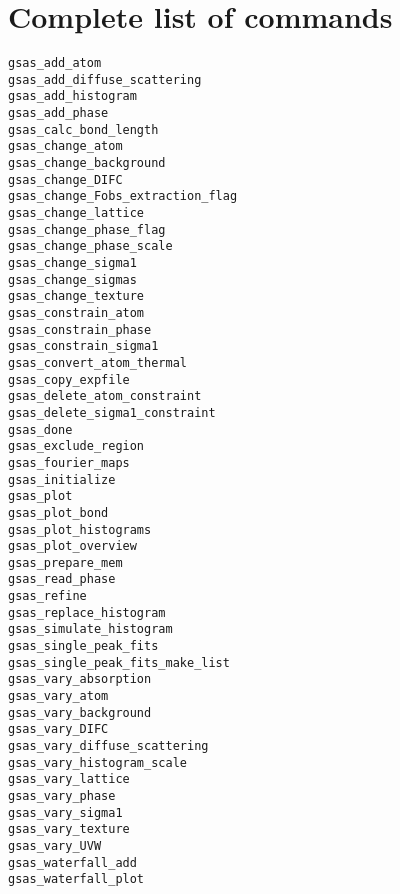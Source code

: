 \section{Complete list of commands}

\begin{verbatim}
gsas_add_atom
gsas_add_diffuse_scattering
gsas_add_histogram
gsas_add_phase
gsas_calc_bond_length
gsas_change_atom
gsas_change_background
gsas_change_DIFC
gsas_change_Fobs_extraction_flag
gsas_change_lattice
gsas_change_phase_flag
gsas_change_phase_scale
gsas_change_sigma1
gsas_change_sigmas
gsas_change_texture
gsas_constrain_atom
gsas_constrain_phase
gsas_constrain_sigma1
gsas_convert_atom_thermal
gsas_copy_expfile
gsas_delete_atom_constraint
gsas_delete_sigma1_constraint
gsas_done
gsas_exclude_region
gsas_fourier_maps
gsas_initialize
gsas_plot
gsas_plot_bond
gsas_plot_histograms
gsas_plot_overview
gsas_prepare_mem
gsas_read_phase
gsas_refine
gsas_replace_histogram
gsas_simulate_histogram
gsas_single_peak_fits
gsas_single_peak_fits_make_list
gsas_vary_absorption
gsas_vary_atom
gsas_vary_background
gsas_vary_DIFC
gsas_vary_diffuse_scattering
gsas_vary_histogram_scale
gsas_vary_lattice
gsas_vary_phase
gsas_vary_sigma1
gsas_vary_texture
gsas_vary_UVW
gsas_waterfall_add
gsas_waterfall_plot
\end{verbatim}

%

